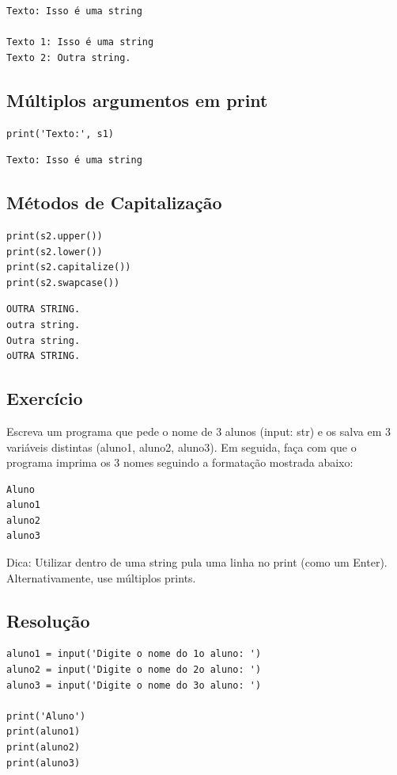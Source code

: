 \documentclass[presentation]{beamer}
\begin{document}
\begin{verbatim}
Texto: Isso é uma string

Texto 1: Isso é uma string
Texto 2: Outra string.
\end{verbatim}


\subsection{Múltiplos argumentos em print}
\label{sec:orgheadline29}
\begin{verbatim}
print('Texto:', s1)
\end{verbatim}

\begin{verbatim}
Texto: Isso é uma string
\end{verbatim}

\subsection{Métodos de Capitalização}
\label{sec:orgheadline30}
\begin{verbatim}
print(s2.upper())
print(s2.lower())
print(s2.capitalize())
print(s2.swapcase())
\end{verbatim}

\begin{verbatim}
OUTRA STRING.
outra string.
Outra string.
oUTRA STRING.
\end{verbatim}
\subsection{Exercício}
\label{sec:orgheadline31}
Escreva um programa que pede o nome de 3 alunos (input: str) e os salva em 3 variáveis distintas (aluno1, aluno2, aluno3). Em seguida, faça com que o programa imprima os 3 nomes seguindo a formatação mostrada abaixo: 

\begin{verbatim}
Aluno
aluno1
aluno2
aluno3
\end{verbatim}

Dica: Utilizar \n dentro de uma string pula uma linha no print (como um Enter). Alternativamente, use múltiplos prints.
\subsection{Resolução}
\label{sec:orgheadline32}
\begin{verbatim}
aluno1 = input('Digite o nome do 1o aluno: ')
aluno2 = input('Digite o nome do 2o aluno: ')
aluno3 = input('Digite o nome do 3o aluno: ')

print('Aluno')
print(aluno1)
print(aluno2)
print(aluno3)
\end{verbatim}
\end{document}
